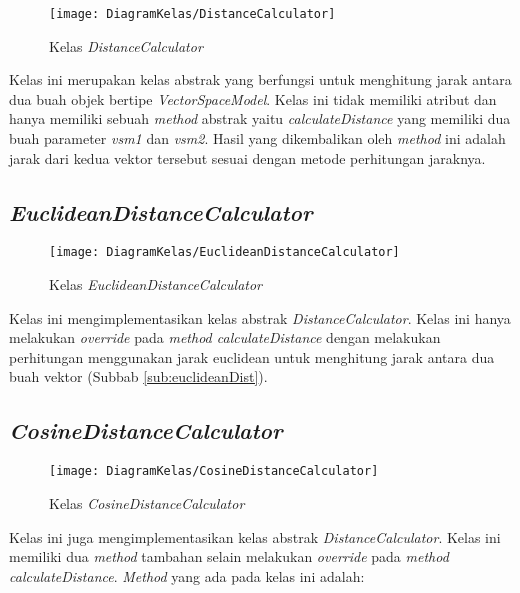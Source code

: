 \begin{figure}[h]
	\begin{center}
		\texttt{[image: DiagramKelas/DistanceCalculator]}
		\caption{Kelas \textit{DistanceCalculator}}
		\label{fig:kelasDistanceCalculator}
	\end{center}
\end{figure}

Kelas ini merupakan kelas abstrak yang berfungsi untuk menghitung jarak antara dua buah objek bertipe \textit{VectorSpaceModel}. Kelas ini tidak memiliki atribut dan hanya memiliki sebuah \textit{method} abstrak yaitu \textit{calculateDistance} yang memiliki dua buah parameter \textit{vsm1} dan \textit{vsm2}. Hasil yang dikembalikan oleh \textit{method} ini adalah jarak dari kedua vektor tersebut sesuai dengan metode perhitungan jaraknya.

\subsection{\textit{EuclideanDistanceCalculator}}

\begin{figure}[h]
	\begin{center}
		\texttt{[image: DiagramKelas/EuclideanDistanceCalculator]}
		\caption{Kelas \textit{EuclideanDistanceCalculator}}
		\label{fig:kelasEuclideanDist}
	\end{center}
\end{figure}

Kelas ini mengimplementasikan kelas abstrak \textit{DistanceCalculator}. Kelas ini hanya melakukan \textit{override} pada \textit{method calculateDistance} dengan melakukan perhitungan menggunakan jarak euclidean untuk menghitung jarak antara dua buah vektor (Subbab \ref{sub:euclideanDist}).

\subsection{\textit{CosineDistanceCalculator}}

\begin{figure}[h]
	\begin{center}
		\texttt{[image: DiagramKelas/CosineDistanceCalculator]}
		\caption{Kelas \textit{CosineDistanceCalculator}}
		\label{fig:kelasCosineDist}
	\end{center}
\end{figure}

Kelas ini juga mengimplementasikan kelas abstrak \textit{DistanceCalculator}. Kelas ini memiliki dua \textit{method} tambahan selain melakukan \textit{override} pada \textit{method calculateDistance}. \textit{Method} yang ada pada kelas ini adalah:

